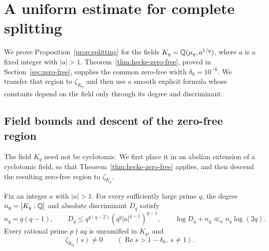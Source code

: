 \section{A uniform estimate for complete splitting}
\label{sec:splitting}

We prove Proposition~\ref{prop:splitting} for the fields
$K_q=\mathbb{Q}(\mu_q,a^{1/q})$, where $a$ is a fixed integer with $|a|>1$.
Theorem~\ref{thm:hecke-zero-free}, proved in
Section~\ref{sec:zero-free}, supplies the common zero-free width
$\delta_0=10^{-6}$. We transfer that region to $\zeta_{K_q}$ and then
use a smooth explicit formula whose constants depend on the field only
through its degree and discriminant.

\subsection{Field bounds and descent of the zero-free region}

The field $K_q$ need not be cyclotomic. We first place it in an abelian
extension of a cyclotomic field, so that
Theorem~\ref{thm:hecke-zero-free} applies, and then descend the resulting
zero-free region to $\zeta_{K_q}$.

\begin{lemma}\label{spl:field-bounds}
Fix an integer $a$ with $|a|>1$. For every sufficiently large prime $q$,
the degree $n_q=[K_q:\mathbb{Q}]$ and absolute discriminant $D_q$ satisfy
\begin{equation}
 n_q=q(q-1),\qquad
 D_q\le q^{q(q-2)}(q^q|a|^{q-1})^{q-1},\qquad
 \log D_q+n_q\ll_a n_q\log(2q).
 \label{spl:degree-discriminant}
\end{equation}
Every rational prime $p\nmid aq$ is unramified in $K_q$, and
\begin{equation}
 \zeta_{K_q}(s)\ne0
 \qquad(\operatorname{Re}s>1-\delta_0,\ s\ne1).
 \label{spl:kummer-zero-free}
\end{equation}
\end{lemma}

